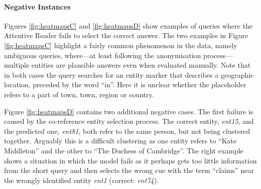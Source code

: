 \paragraph{Negative Instances}
Figures \ref{fig:heatmapsC} and \ref{fig:heatmapsD} show examples of queries
where the Attentive Reader fails to select the correct answer. The two examples
in Figure \ref{fig:heatmapsC} highlight a fairly common phenomenon in the data,
namely ambiguous queries, where---at least following the anonymisation
process---multiple entities are plausible answers even when evaluated manually.
Note that in both cases the query searches for an entity marker that describes a
geographic location, preceded by the word ``in''. Here it is unclear whether
the placeholder refers to a part of town, town, region or country.

Figure \ref{fig:heatmapsD} contains two additional negative cases. The first
failure is caused by the co-reference entity selection process. The correct
entity, \textit{ent15}, and the predicted one, \textit{ent81}, both refer to the
same person, but not being clustered together. Arguably this is a difficult
clustering as one entity refers to ``Kate Middleton'' and the other to ``The
Duchess of Cambridge''.
The right example shows a situation in which the model fails as it
perhaps gets too little information from the short query and then selects the
wrong cue with the term ``claims'' near the wrongly identified entity
\textit{ent1} (correct: \textit{ent74}).

